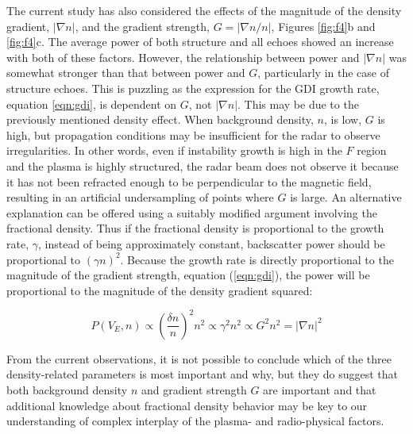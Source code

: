 The current study has also considered the effects of the magnitude of the density gradient, \(|\nabla n|\), and the gradient strength, \(G = |\nabla n/n|\), Figures \ref{fig:f4}b and \ref{fig:f4}c.  The average power of both structure and all echoes showed an increase with both of these factors.  However, the relationship between power and \(|\nabla n|\) was somewhat stronger than that between power and \(G\), particularly in the case of structure echoes. This is puzzling as the expression for the GDI growth rate, equation \ref{eqn:gdi}, is dependent on \(G\), not \(|\nabla n|\).  This may be due to the previously mentioned density effect. When background density, \(n\), is low, \(G\) is high, but propagation conditions may be insufficient for the radar to observe irregularities.  In other words, even if instability growth is high in the \(F\) region and the plasma is highly structured, the radar beam does not observe it because it has not been refracted enough to be perpendicular to the magnetic field, resulting in an artificial undersampling of points where \(G\) is large.  An alternative explanation can be offered using a suitably modified argument involving the fractional density. Thus if the fractional density is proportional to the growth rate, \(\gamma\), instead of being approximately constant, backscatter power should be proportional to \((\gamma n)^2\). Because the growth rate is directly proportional to the magnitude of the gradient strength, equation (\ref{eqn:gdi}), the power will be proportional to the magnitude of the density gradient squared:

\begin{equation}
	\label{eqn:densgrad}
	P(V_E,n) \propto \left(\frac{\delta n}{n}\right)^2 n^2 \propto \gamma^2 n^2 \propto G^2 n^2 = |\nabla n|^2
\end{equation}

From the current observations, it is not possible to conclude which of the three density-related parameters is most important and why, but they do suggest that both background density \(n\) and gradient strength \(G\) are important and that additional knowledge about fractional density behavior may be key to our understanding of complex interplay of the plasma- and radio-physical factors.

